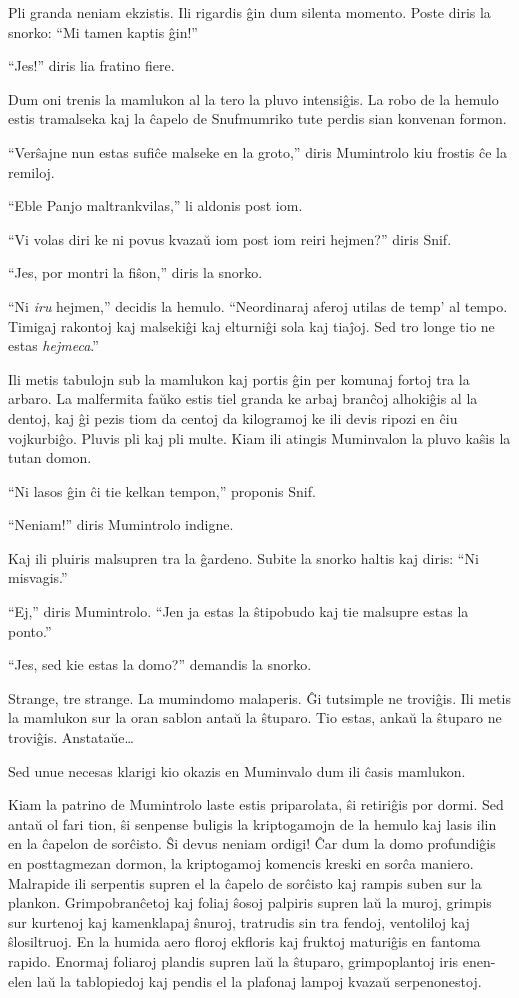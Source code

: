 Pli granda neniam ekzistis. Ili rigardis ĝin dum silenta momento. Poste diris la snorko: ``Mi tamen kaptis ĝin!''

``Jes!'' diris lia fratino fiere.

Dum oni trenis la mamlukon al la tero la pluvo intensiĝis. La robo de la hemulo estis tramalseka kaj la ĉapelo de Snufmumriko tute perdis sian konvenan formon.

``Verŝajne nun estas sufiĉe malseke en la groto,'' diris Mumintrolo kiu frostis ĉe la remiloj.

``Eble Panjo maltrankvilas,'' li aldonis post iom.

``Vi volas diri ke ni povus kvazaŭ iom post iom reiri hejmen?'' diris Snif.

``Jes, por montri la fiŝon,'' diris la snorko.

``Ni \emph{iru} hejmen,'' decidis la hemulo. ``Neordinaraj aferoj utilas de temp' al tempo. Timigaj rakontoj kaj malsekiĝi kaj elturniĝi sola kaj tiaĵoj. Sed tro longe tio ne estas \emph{hejmeca}.''

Ili metis tabulojn sub la mamlukon kaj portis ĝin per komunaj fortoj tra la arbaro. La malfermita faŭko estis tiel granda ke arbaj branĉoj alhokiĝis al la dentoj, kaj ĝi pezis tiom da centoj da kilogramoj ke ili devis ripozi en ĉiu vojkurbiĝo. Pluvis pli kaj pli multe. Kiam ili atingis Muminvalon la pluvo kaŝis la tutan domon.

``Ni lasos ĝin ĉi tie kelkan tempon,'' proponis Snif.

``Neniam!'' diris Mumintrolo indigne.

Kaj ili pluiris malsupren tra la ĝardeno. Subite la snorko haltis kaj diris: ``Ni misvagis.''

``Ej,'' diris Mumintrolo. ``Jen ja estas la ŝtipobudo kaj tie malsupre estas la ponto.''

``Jes, sed kie estas la domo?'' demandis la snorko.

Strange, tre strange. La mumindomo malaperis. Ĝi tutsimple ne troviĝis. Ili metis la mamlukon sur la oran sablon antaŭ la ŝtuparo. Tio estas, ankaŭ la ŝtuparo ne troviĝis. Anstataŭe{\ldots}

Sed unue necesas klarigi kio okazis en Muminvalo dum ili ĉasis mamlukon.

Kiam la patrino de Mumintrolo laste estis priparolata, ŝi retiriĝis por dormi. Sed antaŭ ol fari tion, ŝi senpense buligis la kriptogamojn de la hemulo kaj lasis ilin en la ĉapelon de sorĉisto. Ŝi devus neniam ordigi! Ĉar dum la domo profundiĝis en posttagmezan dormon, la kriptogamoj komencis kreski en sorĉa maniero. Malrapide ili serpentis supren el la ĉapelo de sorĉisto kaj rampis suben sur la plankon. Grimpobranĉetoj kaj foliaj ŝosoj palpiris supren laŭ la muroj, grimpis sur kurtenoj kaj kamenklapaj ŝnuroj, tratrudis sin tra fendoj, ventoliloj kaj ŝlosiltruoj. En la humida aero floroj ekfloris kaj fruktoj maturiĝis en fantoma rapido. Enormaj foliaroj plandis supren laŭ la ŝtuparo, grimpoplantoj iris enen-elen laŭ la tablopiedoj kaj pendis el la plafonaj lampoj kvazaŭ serpenonestoj.

